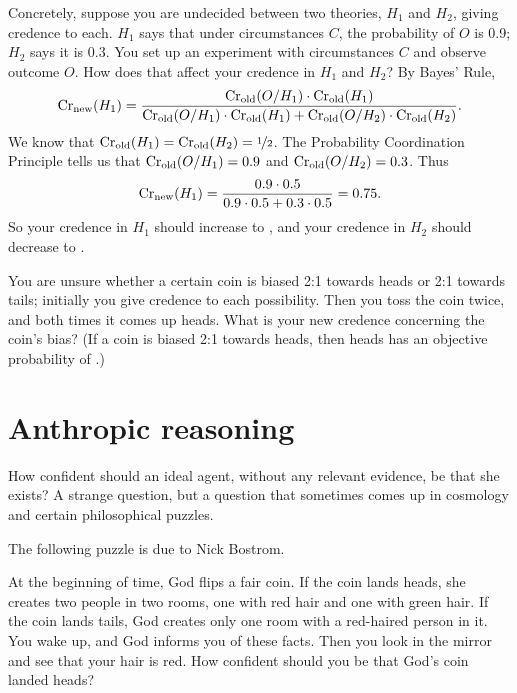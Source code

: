Concretely, suppose you are undecided between two theories, $H_1$ and
$H_2$, giving credence  to each. $H_1$ says that under
circumstances $C$, the probability of $O$ is 0.9; $H_2$ says it is
0.3. You set up an experiment with circumstances $C$ and observe
outcome $O$. How does that affect your credence in $H_1$ and $H_2$? By
Bayes' Rule,
\[
\text{Cr}_{\text{new}}(H_1) = \frac{\text{Cr}_{\text{old}}(O/H_1) \cdot
  \text{Cr}_{\text{old}}(H_1)}{\text{Cr}_\text{old}(O/H_1)\cdot \text{Cr}_\text{old}(H_1) +
  \text{Cr}_\text{old}(O/H_2)\cdot \text{Cr}_\text{old}(H_2)}.
\]
We know that $\text{Cr}_\text{old}(H_1) = \text{Cr}_\text{old}(H_2) =
\nicefrac{1}{2}$. The Probability Coordination Principle tells us that
$\text{Cr}_{\text{old}}(O/H_1) = 0.9$ and $\text{Cr}_{\text{old}}(O/H_2) = 0.3$. Thus 
\[
\text{Cr}_{\text{new}}(H_1) = \frac{0.9 \cdot 0.5}{0.9 \cdot 0.5 + 0.3 \cdot 0.5} = 0.75.
\]
So your credence in $H_1$ should increase to , and your
credence in $H_2$ should decrease to .



\begin{exercise}
  You are unsure whether a certain coin is biased 2:1 towards heads or
  2:1 towards tails; initially you give credence  to
  each possibility. Then you toss the coin twice, and both times it
  comes up heads. What is your new credence concerning the coin's
  bias? (If a coin is biased 2:1 towards heads, then heads has an
  objective probability of .)
\end{exercise}



\section{Anthropic reasoning}

How confident should an ideal agent, without any relevant evidence, be
that she exists? A strange question, but a question that sometimes comes
up in cosmology and certain philosophical puzzles. 

The following puzzle is due to Nick Bostrom.

\begin{example}\label{ex:godscoin}
  At the beginning of time, God flips a fair coin. If the coin lands
  heads, she creates two people in two rooms, one with red hair and
  one with green hair. If the coin lands tails, God creates only one
  room with a red-haired person in it. You wake up, and God informs
  you of these facts. Then you look in the mirror and see that your
  hair is red. How confident should you be that God's coin landed
  heads?
\end{example}

